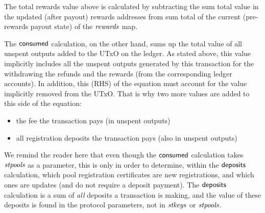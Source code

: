\documentclass[11pt,a4paper,dvipsnames]{article}
\theoremstyle{definition}
\theoremstyle{definition}
\begin{document}
The total rewards value above is calculated by subtracting the sum total value in the
updated (after payout) rewards addresses from sum total of the current (pre-rewards
payout state) of the $\mathit{rewards}$ map.

The $\mathsf{consumed}$ calculation, on the other hand, sums up the total
value of all unspent outputs added to the UTxO on the ledger. As stated
above, this value implicitly includes all the unspent outputs generated
by this transaction for the withdrawing the refunds and the rewards
(from the corresponding ledger accounts). In addition, this (RHS) of the
equation must account for the value implicitly removed from the UTxO. That is why
two more values are added to this side of the equation:

\begin{itemize}
\item the fee the transaction pays (in unspent outputs)
\item all registration
deposits the transaction pays (also in unspent outputs)
\end{itemize}

We remind the reader here that even though the $\mathsf{consumed}$ calculation
takes $\mathit{stpools}$ as a parameter, this is only in order to determine,
within the $\mathsf{deposits}$ calculation, which
pool registration certificates are new registrations, and which ones are updates
(and do not require a deposit payment). The $\mathsf{deposits}$ calculation is
a sum of \textit{all} deposits a transaction is making, and the value of these
deposits is found in the protocol parameters, not in $\mathit{stkeys}$ or $\mathit{stpools}$.
\end{document}
